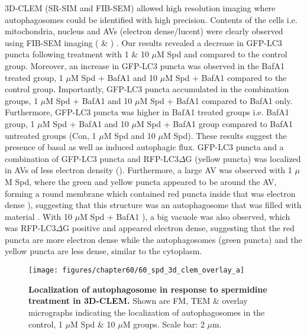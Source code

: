 3D-CLEM (SR-SIM and FIB-SEM) allowed high resolution imaging where autophagosomes could be identified with high precision. Contents of the cells i.e. mitochondria, nucleus and AVs (electron dense/lucent) were clearly observed using FIB-SEM imaging ( \& ) . Our results revealed a decrease in GFP-LC3 puncta following treatment with 1 \& 10 $\mu$M Spd and compared to the control group. Moreover, an increase in GFP-LC3 puncta was observed in the BafA1 treated group, 1 $\mu$M Spd + BafA1 and 10 $\mu$M Spd + BafA1 compared to the control group. Importantly, GFP-LC3 puncta accumulated in the combination groups, 1 $\mu$M Spd + BafA1 and 10 $\mu$M Spd + BafA1 compared to BafA1 only. Furthermore, GFP-LC3 puncta was higher in BafA1 treated groups i.e. BafA1 group, 1 $\mu$M Spd + BafA1 and 10 $\mu$M Spd + BafA1 group compared to BafA1 untreated groups (Con, 1 $\mu$M Spd and 10 $\mu$M Spd). These results suggest the presence of basal as well as induced autophagic flux. GFP-LC3 puncta and a combination of GFP-LC3 puncta and RFP-LC3$\Delta$G (yellow puncta) was localized in AVs of less electron density (). Furthermore, a large AV was observed with 1 $\mu$M Spd, where the green and yellow puncta appeared to be around the AV, forming a round membrane which contained red puncta inside that was electron dense ), suggesting that this structure was an autophagosome that was filled with material . With 10 $\mu$M Spd + BafA1 ), a big vacuole was also observed, which was RFP-LC3$\Delta$G positive and appeared electron dense, suggesting that the red puncta are more electron dense while the autophagosomes (green puncta) and the yellow puncta are less dense, similar to the cytoplasm. 

\begin{landscape}
\begin{figure}[!htbp]
\center
  \texttt{[image: figures/chapter60/60\_spd\_3d\_clem\_overlay\_a]}
  \caption[Localization of autophagosome in response to spermidine treatment in 3D-CLEM]{\textbf{Localization of autophagosome in response to spermidine treatment in 3D-CLEM.} Shown are FM, TEM \& overlay micrographs indicating the localization of autophagosomes in the control, 1 $\mu$M Spd \& 10 $\mu$M groups. Scale bar: 2 $\mu$m.}
  \label{fig:60_spd_3d_clem_overlay_a}
\end{figure} 
\end{landscape}

